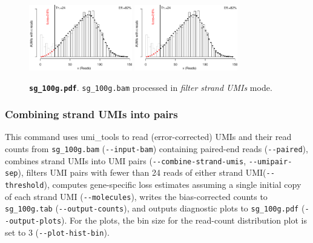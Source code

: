 \documentclass{scrartcl}
\newcommand{\shellscript}[1]{\bgroup\topsep=0pt\partopsep=0pt\shaded%
	\endshaded\egroup}
\newcommand{\ddarg}[1]{\texttt{-{}-#1}}
\begin{document}
\begin{figure}[H]
{\centering
\includegraphics[width=0.4\textwidth,page=1]{../examples/sg_100g.pdf}\hfill
\includegraphics[width=0.4\textwidth,page=2]{../examples/sg_100g.pdf}
\\}
\caption*{\textbf{\texttt{sg\_100g.pdf}}. \texttt{sg\_100g.bam} processed in \emph{filter strand UMIs} mode.}
\end{figure}

\subsubsection*{Combining strand UMIs into pairs}

\shellscript{../examples/sg_100g_comb.cmd}

\enlargethispage{5\baselineskip}
\begin{sloppypar}
This command uses umi\_tools to read (error-corrected) UMIs and their read counts from \texttt{sg\_100g.bam} (\ddarg{input-bam}) containing paired-end reads (\ddarg{paired}), combines strand UMIs into UMI pairs (\ddarg{combine-strand-umis}, \ddarg{umipair-sep}), filters UMI pairs with fewer than 24 reads of either strand UMI(\ddarg{threshold}), computes gene-specific loss estimates assuming a single initial copy of each strand UMI (\ddarg{molecules}), writes the bias-corrected counts to \texttt{sg\_100g.tab} (\ddarg{output-counts}), and outputs diagnostic plots to \texttt{sg\_100g.pdf} (\ddarg{output-plots}). For the plots, the bin size for the read-count distribution plot is set to 3 (\ddarg{plot-hist-bin}).
\end{sloppypar}
\end{document}
